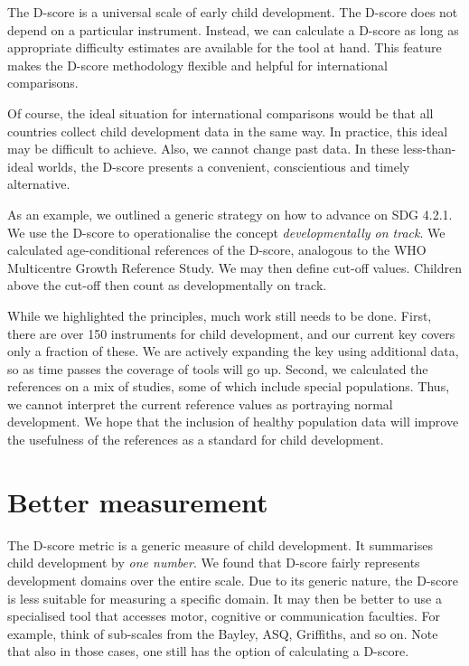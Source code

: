 \documentclass[
]{book}
\begin{document}
The D-score is a universal scale of early child development. The D-score does not depend on a particular instrument. Instead, we can calculate a D-score as long as appropriate difficulty estimates are available for the tool at hand. This feature makes the D-score methodology flexible and helpful for international comparisons.

Of course, the ideal situation for international comparisons would be that all countries collect child development data in the same way. In practice, this ideal may be difficult to achieve. Also, we cannot change past data. In these less-than-ideal worlds, the D-score presents a convenient, conscientious and timely alternative.

As an example, we outlined a generic strategy on how to advance on SDG 4.2.1. We use the D-score to operationalise the concept \emph{developmentally on track}. We calculated age-conditional references of the D-score, analogous to the WHO Multicentre Growth Reference Study. We may then define cut-off values. Children above the cut-off then count as developmentally on track.

While we highlighted the principles, much work still needs to be done. First, there are over 150 instruments for child development, and our current key covers only a fraction of these. We are actively expanding the key using additional data, so as time passes the coverage of tools will go up. Second, we calculated the references on a mix of studies, some of which include special populations. Thus, we cannot interpret the current reference values as portraying normal development. We hope that the inclusion of healthy population data will improve the usefulness of the references as a standard for child development.

\hypertarget{sec:bettermeasurement}{%
\section{Better measurement}\label{sec:bettermeasurement}}

The D-score metric is a generic measure of child development. It summarises child development by \emph{one number}. We found that D-score fairly represents development domains over the entire scale. Due to its generic nature, the D-score is less suitable for measuring a specific domain. It may then be better to use a specialised tool that accesses motor, cognitive or communication faculties. For example, think of sub-scales from the Bayley, ASQ, Griffiths, and so on. Note that also in those cases, one still has the option of calculating a D-score.
\end{document}
